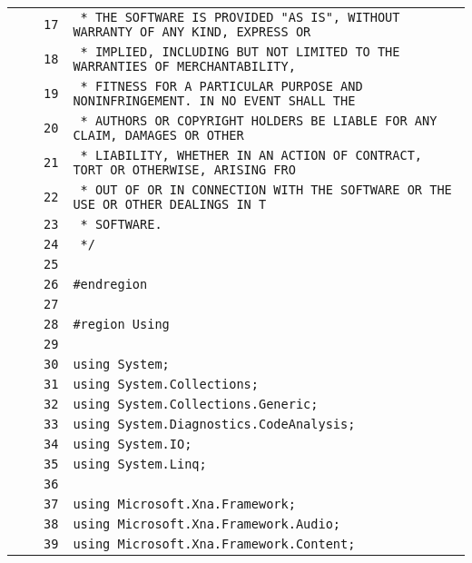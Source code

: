 \documentclass[a4paper,10pt]{article}
\begin{document}
\begin{longtable}[l]{lrrl}
\cellcolor{gray} &  & \verb~17~ & \verb~ * THE SOFTWARE IS PROVIDED "AS IS", WITHOUT WARRANTY OF ANY KIND, EXPRESS OR~\\
\cellcolor{gray} &  & \verb~18~ & \verb~ * IMPLIED, INCLUDING BUT NOT LIMITED TO THE WARRANTIES OF MERCHANTABILITY,~\\
\cellcolor{gray} &  & \verb~19~ & \verb~ * FITNESS FOR A PARTICULAR PURPOSE AND NONINFRINGEMENT. IN NO EVENT SHALL THE~\\
\cellcolor{gray} &  & \verb~20~ & \verb~ * AUTHORS OR COPYRIGHT HOLDERS BE LIABLE FOR ANY CLAIM, DAMAGES OR OTHER~\\
\cellcolor{gray} &  & \verb~21~ & \verb~ * LIABILITY, WHETHER IN AN ACTION OF CONTRACT, TORT OR OTHERWISE, ARISING FRO~\\
\cellcolor{gray} &  & \verb~22~ & \verb~ * OUT OF OR IN CONNECTION WITH THE SOFTWARE OR THE USE OR OTHER DEALINGS IN T~\\
\cellcolor{gray} &  & \verb~23~ & \verb~ * SOFTWARE.~\\
\cellcolor{gray} &  & \verb~24~ & \verb~ */~\\
\cellcolor{gray} &  & \verb~25~ & \verb~~\\
\cellcolor{gray} &  & \verb~26~ & \verb~#endregion~\\
\cellcolor{gray} &  & \verb~27~ & \verb~~\\
\cellcolor{gray} &  & \verb~28~ & \verb~#region Using~\\
\cellcolor{gray} &  & \verb~29~ & \verb~~\\
\cellcolor{gray} &  & \verb~30~ & \verb~using System;~\\
\cellcolor{gray} &  & \verb~31~ & \verb~using System.Collections;~\\
\cellcolor{gray} &  & \verb~32~ & \verb~using System.Collections.Generic;~\\
\cellcolor{gray} &  & \verb~33~ & \verb~using System.Diagnostics.CodeAnalysis;~\\
\cellcolor{gray} &  & \verb~34~ & \verb~using System.IO;~\\
\cellcolor{gray} &  & \verb~35~ & \verb~using System.Linq;~\\
\cellcolor{gray} &  & \verb~36~ & \verb~~\\
\cellcolor{gray} &  & \verb~37~ & \verb~using Microsoft.Xna.Framework;~\\
\cellcolor{gray} &  & \verb~38~ & \verb~using Microsoft.Xna.Framework.Audio;~\\
\cellcolor{gray} &  & \verb~39~ & \verb~using Microsoft.Xna.Framework.Content;~\\

\end{longtable}
\end{document}
